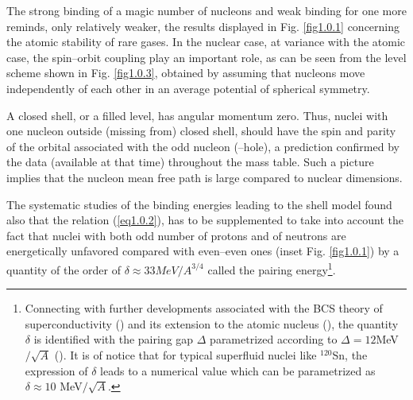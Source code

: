 \documentclass[a4paper,11pt]{book}
\numberwithin{equation}{section}
\numberwithin{figure}{section}
\numberwithin{table}{section}
\begin{document}
The strong binding of a magic number of nucleons and weak binding for one more reminds, only relatively  weaker, the results displayed in Fig.  \ref{fig1.0.1}  concerning the atomic stability of rare gases. In the nuclear case, at variance with the atomic case, the spin--orbit coupling play an important role, as can be seen from the level scheme shown in Fig. \ref{fig1.0.3}, obtained by assuming that nucleons move independently of each other in an average potential  of  spherical symmetry.


A closed shell, or a filled level, has angular momentum zero. Thus, nuclei with one nucleon outside (missing from) closed shell, should have the spin and parity of the orbital associated with the odd nucleon (--hole), a prediction confirmed by the data (available at that time) throughout the mass table. Such a picture implies that the nucleon mean free path is large compared to nuclear dimensions.


The systematic studies of the binding energies leading to the shell model found also that the relation (\ref{eq1.0.2}), has to be supplemented to take into account the fact that nuclei with both odd number of protons and of neutrons are energetically unfavored compared with even--even ones (inset Fig. \ref{fig1.0.1}) by a quantity of the order of $\delta\approx33MeV/A^{3/4}$ called the pairing energy\footnote{Connecting with further developments associated with the BCS theory of superconductivity (\cite{Bardeen:57a,Bardeen:57b}) and its extension to the atomic nucleus (\cite{Bohr:58}), the quantity $\delta$ is identified with the pairing gap $\Delta$ parametrized according to $\Delta=12 $MeV$/\sqrt{A}$ (\cite{Bohr:69}). It is of notice that for typical superfluid nuclei like $^{120}$Sn, the expression of $\delta$ leads to a numerical value which can be parametrized as  $\delta\approx10$ MeV$/\sqrt{A}$.}.
\end{document}
